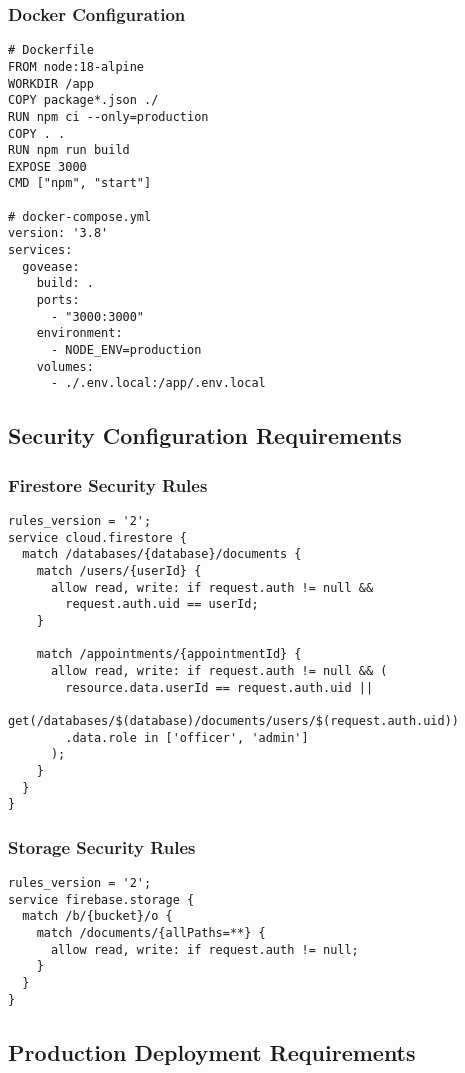 \documentclass[12pt,a4paper]{article}
\begin{document}
\subsubsection{Docker Configuration}

\begin{verbatim}
# Dockerfile
FROM node:18-alpine
WORKDIR /app
COPY package*.json ./
RUN npm ci --only=production
COPY . .
RUN npm run build
EXPOSE 3000
CMD ["npm", "start"]

# docker-compose.yml
version: '3.8'
services:
  govease:
    build: .
    ports:
      - "3000:3000"
    environment:
      - NODE_ENV=production
    volumes:
      - ./.env.local:/app/.env.local
\end{verbatim}

\subsection{Security Configuration Requirements}

\subsubsection{Firestore Security Rules}

\begin{verbatim}
rules_version = '2';
service cloud.firestore {
  match /databases/{database}/documents {
    match /users/{userId} {
      allow read, write: if request.auth != null && 
        request.auth.uid == userId;
    }
    
    match /appointments/{appointmentId} {
      allow read, write: if request.auth != null && (
        resource.data.userId == request.auth.uid ||
        get(/databases/$(database)/documents/users/$(request.auth.uid))
        .data.role in ['officer', 'admin']
      );
    }
  }
}
\end{verbatim}

\subsubsection{Storage Security Rules}

\begin{verbatim}
rules_version = '2';
service firebase.storage {
  match /b/{bucket}/o {
    match /documents/{allPaths=**} {
      allow read, write: if request.auth != null;
    }
  }
}
\end{verbatim}

\subsection{Production Deployment Requirements}
\end{document}
